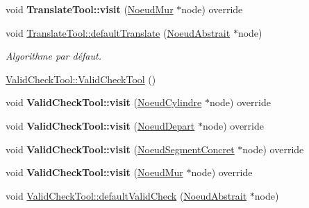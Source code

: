 \begin{DoxyCompactItemize}
\item 
\hypertarget{group__inf2990_ga7172d03575c6b5062c61753f8d0bce08}{}void {\bfseries Translate\+Tool\+::visit} (\hyperlink{class_noeud_mur}{Noeud\+Mur} $\ast$node) override\label{group__inf2990_ga7172d03575c6b5062c61753f8d0bce08}

\item 
void \hyperlink{group__inf2990_ga1e47597de16ebba1986441232607d6dc}{Translate\+Tool\+::default\+Translate} (\hyperlink{class_noeud_abstrait}{Noeud\+Abstrait} $\ast$node)
\begin{DoxyCompactList}\small\item\em Algorithme par défaut. \end{DoxyCompactList}\item 
\hyperlink{group__inf2990_ga4e827b025969ce7fa8204c6a62cf27c6}{Valid\+Check\+Tool\+::\+Valid\+Check\+Tool} ()
\item 
\hypertarget{group__inf2990_ga032c8fa96e75b6300ce0ad8692250c0c}{}void {\bfseries Valid\+Check\+Tool\+::visit} (\hyperlink{class_noeud_cylindre}{Noeud\+Cylindre} $\ast$node) override\label{group__inf2990_ga032c8fa96e75b6300ce0ad8692250c0c}

\item 
\hypertarget{group__inf2990_gab3f77ff9294703aa3b3806c505421136}{}void {\bfseries Valid\+Check\+Tool\+::visit} (\hyperlink{class_noeud_depart}{Noeud\+Depart} $\ast$node) override\label{group__inf2990_gab3f77ff9294703aa3b3806c505421136}

\item 
\hypertarget{group__inf2990_ga78a2a77e640811375ddcf280792bc9ce}{}void {\bfseries Valid\+Check\+Tool\+::visit} (\hyperlink{class_noeud_segment_concret}{Noeud\+Segment\+Concret} $\ast$node) override\label{group__inf2990_ga78a2a77e640811375ddcf280792bc9ce}

\item 
\hypertarget{group__inf2990_gad91e261311122bc94172813602534772}{}void {\bfseries Valid\+Check\+Tool\+::visit} (\hyperlink{class_noeud_mur}{Noeud\+Mur} $\ast$node) override\label{group__inf2990_gad91e261311122bc94172813602534772}

\item 
\hypertarget{group__inf2990_ga58a361b0ca91a2b7acb338d39bc0172a}{}void \hyperlink{group__inf2990_ga58a361b0ca91a2b7acb338d39bc0172a}{Valid\+Check\+Tool\+::default\+Valid\+Check} (\hyperlink{class_noeud_abstrait}{Noeud\+Abstrait} $\ast$node)\label{group__inf2990_ga58a361b0ca91a2b7acb338d39bc0172a}


\end{DoxyCompactItemize}
